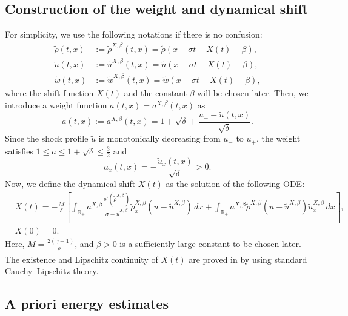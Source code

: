 \documentclass[11pt,reqno]{amsart}
\numberwithin{equation}{section} %
\begin{document}
\subsection{Construction of the weight and dynamical shift}
For simplicity, we use the following notations if there is no confusion:
\begin{align*}
    \tilde{\rho}(t,x) &:= \tilde{\rho}^{X,\beta}(t,x) = \tilde{\rho}(x-\sigma t - X(t) - \beta),\\
    \tilde{u}(t,x) &:= \tilde{u}^{X,\beta}(t,x) = \tilde{u}(x-\sigma t - X(t) - \beta),\\
    \tilde{w}(t,x) &:= \tilde{w}^{X,\beta}(t,x) = \tilde{w}(x-\sigma t - X(t) - \beta),
\end{align*}
where the shift function $X(t)$ and the constant $\beta$ will be chosen later. Then, we introduce a weight function $a(t,x) = a^{X,\beta}(t,x)$ as
\begin{equation}\label{def:a}
    a(t,x) := a^{X,\beta}(t,x) = 1 +\sqrt{\delta} + \frac{u_+ - \tilde{u}(t,x)}{\sqrt{\delta}}.
\end{equation}
Since the shock profile $\tilde{u}$ is monotonically decreasing from $u_-$ to $u_+$, the weight satisfies $1 \leq a \leq 1+ \sqrt{\delta} \leq \frac{3}{2}$ and
\begin{equation*}%
    a_x(t,x) = -\frac{\tilde{u}_x(t,x)}{\sqrt{\delta}} > 0.
\end{equation*}
Now, we define the dynamical shift $X(t)$ as the solution of the following ODE:
\begin{equation}\label{def:X}
    \begin{aligned}
        &\dot{X}(t) = -\frac{M}{\delta}\left[\int_{\mathbb{R}_+} a^{X,\beta} \frac{p'(\tilde{\rho}^{X,\beta})}{\sigma -\tilde{u}^{X,\beta}}\tilde{\rho}^{X,\beta}_x(u-\tilde{u}^{X,\beta})\,dx + \int_{\mathbb{R}_+} a^{X,\beta} \tilde{\rho}^{X,\beta} (u - \tilde{u}^{X,\beta})\tilde{u}^{X,\beta}_x\,dx\right],\\
        &X(0)=0.
    \end{aligned}
\end{equation}
Here, $M = \frac{2(\gamma+1)}{\rho_+}$, and $\beta>0$ is a sufficiently large constant to be chosen later. The existence and Lipschitz continuity of $X(t)$ are proved in \cite{KVW23} by using standard Cauchy--Lipschitz theory.

\subsection{A priori energy estimates}
\end{document}
